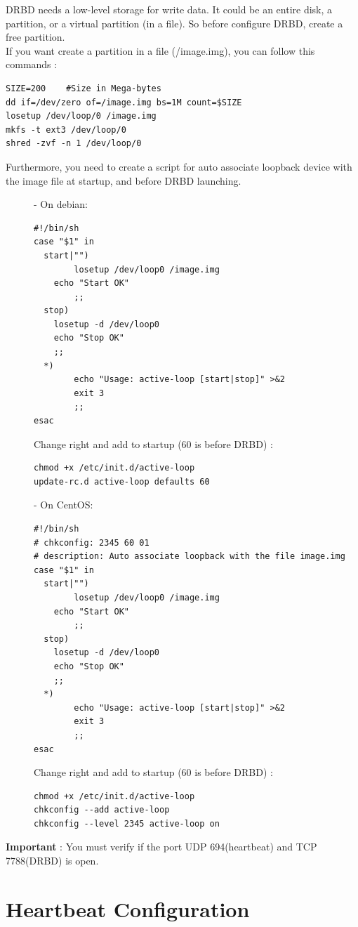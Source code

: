 \documentclass[a4paper,10pt]{report}
\begin{document}
DRBD needs a low-level storage for write data. It could be an entire disk, a partition, or a virtual partition (in a file). So before configure DRBD, create a free partition.\\
If you want create a partition in a file (/image.img), you can follow this commands :
\begin{lstlisting}
SIZE=200	#Size in Mega-bytes
dd if=/dev/zero of=/image.img bs=1M count=$SIZE
losetup /dev/loop/0 /image.img
mkfs -t ext3 /dev/loop/0
shred -zvf -n 1 /dev/loop/0	
\end{lstlisting}
Furthermore, you need to create a script for auto associate loopback device with the image file at startup, and before DRBD launching.
\begin{description}
\item[]- On debian:
\begin{lstlisting}
#!/bin/sh
case "$1" in
  start|"") 
        losetup /dev/loop0 /image.img
	echo "Start OK"
        ;;
  stop)
	losetup -d /dev/loop0
	echo "Stop OK"
	;;
  *)
        echo "Usage: active-loop [start|stop]" >&2
        exit 3
        ;;
esac
\end{lstlisting}
Change right and add to startup (60 is before DRBD) :
\begin{lstlisting}
chmod +x /etc/init.d/active-loop
update-rc.d active-loop defaults 60
\end{lstlisting}

\item[]- On CentOS:
\begin{lstlisting}
#!/bin/sh
# chkconfig: 2345 60 01
# description: Auto associate loopback with the file image.img
case "$1" in
  start|"") 
        losetup /dev/loop0 /image.img
	echo "Start OK"
        ;;
  stop)
	losetup -d /dev/loop0
	echo "Stop OK"
	;;
  *)
        echo "Usage: active-loop [start|stop]" >&2
        exit 3
        ;;
esac
\end{lstlisting}
Change right and add to startup (60 is before DRBD) :
\begin{lstlisting}
chmod +x /etc/init.d/active-loop
chkconfig --add active-loop
chkconfig --level 2345 active-loop on
\end{lstlisting}
\end{description}

\textbf{Important} : You must verify if the port UDP 694(heartbeat) and TCP 7788(DRBD) is open.

\section{Heartbeat Configuration}
\end{document}
